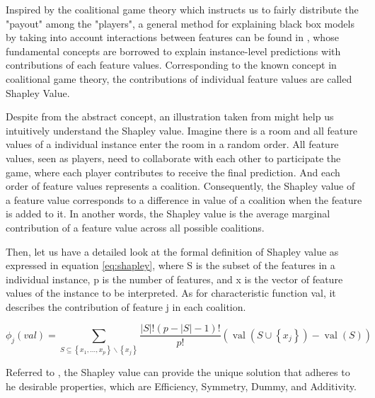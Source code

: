 Inspired by the coalitional game theory which instructs us to fairly distribute the "payout" among the "players", a general method for explaining black box models by taking into account interactions between features can be found in \cite{kononenko2010efficient}, whose fundamental concepts are borrowed to explain instance-level predictions with contributions of each feature values. Corresponding to the known concept in coalitional game theory, the contributions of individual feature values are called Shapley Value.

Despite from the abstract concept, an illustration taken from \cite{molnar2019} might help us intuitively understand the Shapley value. Imagine there is a room and all feature values of a individual instance enter the room in a random order. All feature values, seen as players, need to collaborate with each other to participate the game, where each player contributes to receive the final prediction. And each order of feature values represents a coalition. Consequently, the Shapley value of a feature value corresponds to a difference in value of a coalition when the feature is added to it. In another words, the Shapley value is the average marginal contribution of a feature value across all possible coalitions. 

Then, let us have a detailed look at the formal definition of Shapley value as expressed in equation \ref{eq:shapley}, where S is the subset of the features in a individual instance, p is the number of features, and x is the vector of feature values of the instance to be interpreted. As for characteristic function val, it describes the contribution of feature j in each coalition.




\begin{equation} \label{eq:shapley}
\phi_{j}(v a l)=\sum_{S \subseteq\left\{x_{1}, \ldots, x_{p}\right\} \backslash\left\{x_{j}\right\}} \frac{|S| !(p-|S|-1) !}{p !}\left(\operatorname{val}\left(S \cup\left\{x_{j}\right\}\right)-\operatorname{val}(S)\right)
\end{equation}

Referred to \cite{shapley1953value}, the Shapley value can provide the unique solution that adheres to he desirable properties, which are Efficiency, Symmetry, Dummy, and Additivity.

